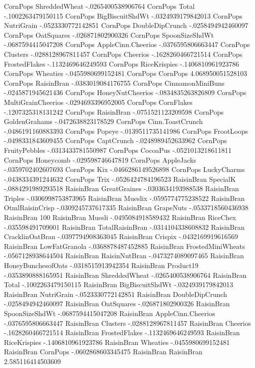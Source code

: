 CornPops	ShreddedWheat	-.0265400538906764
CornPops	Total	-.1002263479150115
CornPops	BigBiscuitShdWt	-.0324939179842013
CornPops	NutriGrain	-.0523330772142851
CornPops	DoubleDipCrunch	-.0258494942460097
CornPops	OatSquares	-.026871802900326
CornPops	SpoonSizeShdWt	-.0687594415047208
CornPops	AppleCinn.Cheerios	-.0376595806663447
CornPops	Clusters	-.0288128967811457
CornPops	Cheerios	-.1628260466721514
CornPops	FrostedFlakes	-.1132469646249593
CornPops	RiceKrispies	-.1406810961923786
CornPops	Wheaties	-.0455980699152481
CornPops	CornPops	4.068950051528103
CornPops	RaisinBran	-.0383019084176755
CornPops	CinnamonMiniBuns	-.0245871945621436
CornPops	HoneyNutCheerios	-.0834835263826809
CornPops	MultiGrainCheerios	-.0294693396952005
CornPops	CornFlakes	-.1207325318131242
CornPops	RaisinBran	-.0751521123209598
CornPops	GoldenGrahams	-.0472638823178529
CornPops	Cinn.ToastCrunch	-.0486191160883393
CornPops	Popeye	-.0139511735141986
CornPops	FrootLoops	-.0498331843609455
CornPops	CaptCrunch	-.0248989452633962
CornPops	FruityPebbles	-.0313433781550987
CornPops	CocoaPus	-.0521013218611811
CornPops	Honeycomb	-.029598746647819
CornPops	AppleJacks	-.0359702402607693
CornPops	Kix	-.0466286149526898
CornPops	LuckyCharms	-.0438334391244632
CornPops	Trix	-.0526424784196523
RaisinBran	SpecialK	-.0884291989293518
RaisinBran	GreatGraines	-.0303634193988538
RaisinBran	Triples	-.0306998753873965
RaisinBran	Mueslix	-.0595774775238522
RaisinBran	OtmlRaisinCrisp	-.0309245737617335
RaisinBran	GrapeNuts	-.0533718560436938
RaisinBran	100%
RaisinBran	Muesli	-.0495084918589432
RaisinBran	RiceChex	-.035598491709001
RaisinBran	TotalRaisinBran	-.0314104338608832
RaisinBran	CracklinOatBran	-.0397794908363045
RaisinBran	Crispix	-.0432169919616569
RaisinBran	LowFatGranola	-.0368878487452885
RaisinBran	FrostedMiniWheats	-.0567128938644504
RaisinBran	RaisinNutBran	-.0473274089097465
RaisinBran	HoneyBunchesofOats	-.0318515913942354
RaisinBran	Product19	-.0353890888165951
RaisinBran	ShreddedWheat	-.0265400538906764
RaisinBran	Total	-.1002263479150115
RaisinBran	BigBiscuitShdWt	-.0324939179842013
RaisinBran	NutriGrain	-.0523330772142851
RaisinBran	DoubleDipCrunch	-.0258494942460097
RaisinBran	OatSquares	-.026871802900326
RaisinBran	SpoonSizeShdWt	-.0687594415047208
RaisinBran	AppleCinn.Cheerios	-.0376595806663447
RaisinBran	Clusters	-.0288128967811457
RaisinBran	Cheerios	-.1628260466721514
RaisinBran	FrostedFlakes	-.1132469646249593
RaisinBran	RiceKrispies	-.1406810961923786
RaisinBran	Wheaties	-.0455980699152481
RaisinBran	CornPops	-.0602868603345475
RaisinBran	RaisinBran	2.585116414503609
